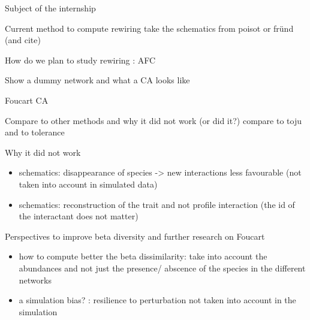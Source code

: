 \documentclass{beamer}
\begin{document}
\begin{frame}{Subject of the internship}
\protect\hypertarget{subject-of-the-internship}{}
\end{frame}

\begin{frame}{Current method to compute rewiring}
\protect\hypertarget{current-method-to-compute-rewiring}{}
take the schematics from poisot or fründ (and cite)


\vspace{-1em}
\end{frame}

\begin{frame}{How do we plan to study rewiring : AFC}
  \protect\hypertarget{how-do-we-plan-to-study-rewiring--afc}{}
  \begin{block}{Show a dummy network and what a CA looks like}
    \protect\hypertarget{show-a-dummy-network-and-what-a-ca-looks-like}{}
  \end{block}
\end{frame}

\begin{frame}{Foucart CA}
\protect\hypertarget{foucart-ca}{}
\end{frame}

\begin{frame}{Compare to other methods and why it did not work (or did
it?)}
\protect\hypertarget{compare-to-other-methods-and-why-it-did-not-work-or-did-it}{}
compare to toju and to tolerance
\end{frame}

\begin{frame}{Why it did not work}
\protect\hypertarget{why-it-did-not-work}{}
\begin{itemize}
\tightlist
\item
  schematics: disappearance of species -\textgreater{} new interactions
  less favourable (not taken into account in simulated data)
\item
  schematics: reconstruction of the trait and not profile interaction
  (the id of the interactant does not matter)
\end{itemize}
\end{frame}

\begin{frame}{Perspectives to improve beta diversity and further
research on Foucart}
\protect\hypertarget{perspectives-to-improve-beta-diversity-and-further-research-on-foucart}{}
\begin{itemize}
\item
  how to compute better the beta dissimilarity: take into account the
  abundances and not just the presence/ abscence of the species in the
  different networks
\item
  a simulation bias? : resilience to perturbation not taken into account
  in the simulation
\end{itemize}
\end{frame}
\end{document}
